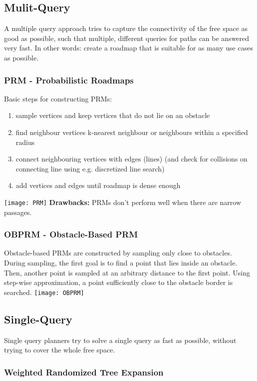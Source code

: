 \begin{multicols*}{2}
\subsection{Mulit-Query}
A multiple query approach tries to capture the connectivity of the free space as good as possible, such that multiple, different queries for paths can be answered very fast. In other words: create a roadmap that is suitable for as many use cases as possible.

\subsubsection{PRM - Probabilistic Roadmaps}
Basic steps for constructing PRMs:
\begin{enumerate}
	\item sample vertices and keep vertices that do not lie on an obstacle
	\item find neighbour vertices
		\subitem k-nearest neighbour or
		\subitem neighbours within a specified radius
	\item connect neighbouring vertices with edges (lines) (and check for collisions on connecting line using e.g. discretized line search)
	\item add vertices and edges until roadmap is dense
enough
\end{enumerate}
\texttt{[image: PRM]}
\textbf{Drawbacks: } PRMs don't perform well when there are narrow passages.

\subsubsection{OBPRM - Obstacle-Based PRM}
Obstacle-based PRMs are constructed by sampling only close to obstacles. During sampling, the first goal is to find a point that lies inside an obstacle. Then, another point is sampled at an arbitrary distance to the first point. Using step-wise approximation, a point sufficiently close to the obstacle border is searched.
\texttt{[image: OBPRM]}

\subsection{Single-Query}
Single query planners try to solve a single query as fast as possible, without trying to cover the whole free space.

\subsubsection{Weighted Randomized Tree Expansion}


\end{multicols*}
